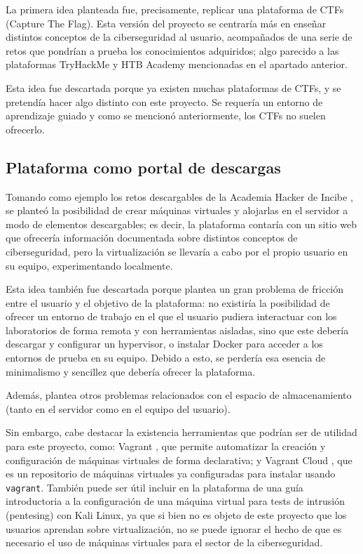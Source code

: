             La primera idea planteada fue, precisamente, replicar una plataforma de CTFs (Capture The Flag). Esta versión del proyecto se centraría más en enseñar distintos conceptos de la ciberseguridad al usuario, acompañados de una serie de retos que pondrían a prueba los conocimientos adquiridos; algo parecido a las plataformas TryHackMe y HTB Academy mencionadas en el apartado anterior.

            Esta idea fue descartada porque ya existen muchas plataformas de CTFs, y se pretendía hacer algo distinto con este proyecto. Se requería un entorno de aprendizaje guiado y como se mencionó anteriormente, los CTFs no suelen ofrecerlo.

        \subsection{Plataforma como portal de descargas}

            Tomando como ejemplo los retos descargables de la Academia Hacker de Incibe \cite{retos-INCIBE}, se planteó la posibilidad de crear máquinas virtuales y alojarlas en el servidor a modo de elementos descargables; es decir, la plataforma contaría con un sitio web que ofrecería información documentada sobre distintos conceptos de ciberseguridad, pero la virtualización se llevaría a cabo por el propio usuario en su equipo, experimentando localmente.

            Esta idea también fue descartada porque plantea un gran problema de fricción entre el usuario y el objetivo de la plataforma: no existiría la posibilidad de ofrecer un entorno de trabajo en el que el usuario pudiera interactuar con los laboratorios de forma remota y con herramientas aisladas, sino que este debería descargar y configurar un hypervisor, o instalar Docker para acceder a los entornos de prueba en su equipo. Debido a esto, se perdería esa esencia de minimalismo y sencillez que debería ofrecer la plataforma.
            
            Además, plantea otros problemas relacionados con el espacio de almacenamiento (tanto en el servidor como en el equipo del usuario).

            Sin embargo, cabe destacar la existencia herramientas que podrían ser de utilidad para este proyecto, como: Vagrant \cite{vagrant}, que permite automatizar la creación y configuración de máquinas virtuales de forma declarativa; y Vagrant Cloud \cite{vagrant-cloud}, que es un repositorio de máquinas virtuales ya configuradas para instalar usando \texttt{vagrant}. También puede ser útil incluir en la plataforma de una guía introductoria a la configuración de una máquina virtual para tests de intrusión (pentesing) con Kali Linux, ya que si bien no es objeto de este proyecto que los usuarios aprendan sobre virtualización, no se puede ignorar el hecho de que es necesario el uso de máquinas virtuales para el sector de la ciberseguridad.


